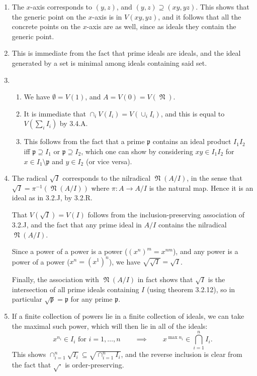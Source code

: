 \documentclass{report}
\newcommand{\rad}[1]{\sqrt{#1}} %
\newcommand{\p}{\mathfrak{p}}
\DeclareMathOperator{\nilrad}{\mathfrak{N}}
\begin{document}
\begin{enumerate}[label=\textbf{3.4.\Alph*.}]
	\item The $x$-axis corresponds to $(y,z)$, and $(y,z)\supseteq(xy,yz)$. This
	      shows that the generic point on the $x$-axis is in $V(xy,yz)$, and it
	      follows that all the concrete points on the $x$-axis are as well, since
	      as ideals they contain the generic point.

	\item This is immediate from the fact that prime ideals are ideals, and the
	      ideal generated by a set is minimal among ideals containing said set.

	\item
	      \begin{enumerate}[label=(\alph*)]
		      \item We have $\emptyset=V(1)$, and $A=V(0)=V(\nilrad)$.

		      \item It is immediate that $\cap_iV(I_i)=V(\cup_iI_i)$, and this is
		            equal to $V(\sum_iI_i)$ by 3.4.A.

		      \item This follows from the fact that a prime $\p$ contains an ideal
		            product $I_1I_2$ iff $\p\supseteq I_1$ or $\p\supseteq I_2$,
		            which one can show by considering $xy\in I_1I_2$ for
		            $x\in I_1\setminus\p$ and $y\in I_2$ (or vice versa).
	      \end{enumerate}

	\item The radical $\rad I$ corresponds to the nilradical $\nilrad(A/I)$, in
	      the sense that $\rad I=\pi^{-1}(\nilrad(A/I))$ where $\pi:A\to A/I$ is
	      the natural map. Hence it is an ideal as in 3.2.J, by 3.2.R.

	      That $V(\rad I)=V(I)$ follows from the inclusion-preserving association
	      of 3.2.J, and the fact that any prime ideal in $A/I$ contains the
	      nilradical $\nilrad(A/I)$.

	      Since a power of a power is a power ($(x^n)^m=x^{nm}$), and any power is
	      a power of a power ($x^n=(x^1)^n$), we have $\rad{\rad I}=\rad I$.

	      Finally, the association with $\nilrad(A/I)$ in fact shows that $\rad I$
	      is the intersection of all prime ideals containing $I$ (using theorem
	      3.2.12), so in particular $\rad\p=\p$ for any prime $\p$.

	\item If a finite collection of powers lie in a finite collection of ideals,
	      we can take the maximal such power, which will then lie in all of the
	      ideals:
	      \begin{equation*}
		      \text{$x^{n_i}\in I_i$ for $i=1,\ldots,n$}
		      \qquad\implies\qquad
		      \text{$x^{\max n_i}\in\bigcap_{i=1}^nI_i$}.
	      \end{equation*}
	      This shows $\cap_{i=1}^n\rad{I_i}\subseteq\rad{\cap_{i=1}^nI_i}$, and
	      the reverse inclusion is clear from the fact that $\rad\cdot$ is
	      order-preserving.


\end{enumerate}
\end{document}
